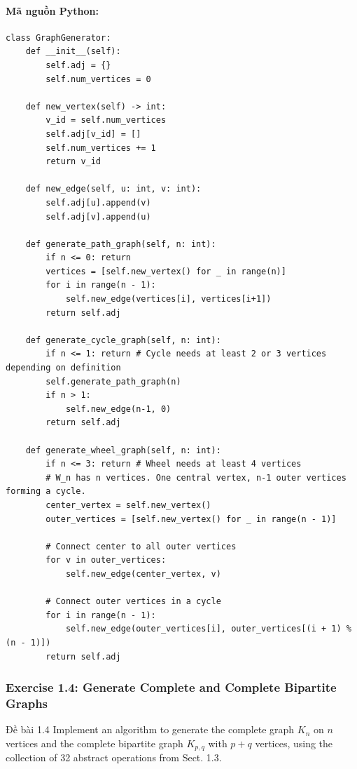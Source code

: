 \documentclass[a4paper,12pt]{article}
\begin{document}
\paragraph{Mã nguồn Python:}
\begin{lstlisting}[style=pythonstyle, caption={Sinh các họ đồ thị cơ bản.}]
class GraphGenerator:
    def __init__(self):
        self.adj = {}
        self.num_vertices = 0

    def new_vertex(self) -> int:
        v_id = self.num_vertices
        self.adj[v_id] = []
        self.num_vertices += 1
        return v_id

    def new_edge(self, u: int, v: int):
        self.adj[u].append(v)
        self.adj[v].append(u)

    def generate_path_graph(self, n: int):
        if n <= 0: return
        vertices = [self.new_vertex() for _ in range(n)]
        for i in range(n - 1):
            self.new_edge(vertices[i], vertices[i+1])
        return self.adj

    def generate_cycle_graph(self, n: int):
        if n <= 1: return # Cycle needs at least 2 or 3 vertices depending on definition
        self.generate_path_graph(n)
        if n > 1:
            self.new_edge(n-1, 0)
        return self.adj
        
    def generate_wheel_graph(self, n: int):
        if n <= 3: return # Wheel needs at least 4 vertices
        # W_n has n vertices. One central vertex, n-1 outer vertices forming a cycle.
        center_vertex = self.new_vertex()
        outer_vertices = [self.new_vertex() for _ in range(n - 1)]
        
        # Connect center to all outer vertices
        for v in outer_vertices:
            self.new_edge(center_vertex, v)
        
        # Connect outer vertices in a cycle
        for i in range(n - 1):
            self.new_edge(outer_vertices[i], outer_vertices[(i + 1) % (n - 1)])
        return self.adj
\end{lstlisting}

\subsubsection{Exercise 1.4: Generate Complete and Complete Bipartite Graphs}
\begin{problembox}{Đề bài 1.4}
    Implement an algorithm to generate the complete graph $K_n$ on $n$ vertices and the complete bipartite graph $K_{p,q}$ with $p+q$ vertices, using the collection of 32 abstract operations from Sect. 1.3.
\end{problembox}
\end{document}

